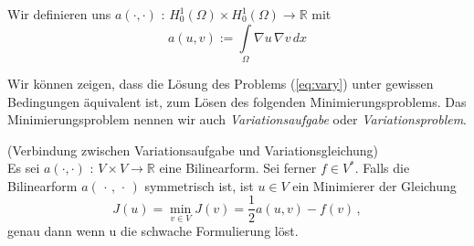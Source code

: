 Wir definieren uns $a( \cdot , \cdot )$ : $H^1_0 (\Omega) \times H^1_0(\Omega) \rightarrow \mathbb{R}$ mit
\begin{equation*}
a(u,v) := \int\limits_{\Omega} \nabla u \, \nabla v \, dx
\end{equation*}

Wir können zeigen, dass die Lösung des Problems (\ref{eq:vary}) unter gewissen Bedingungen äquivalent ist, zum Lösen des folgenden Minimierungsproblems. Das Minimierungsproblem nennen wir auch \textit{Variationsaufgabe} oder \textit{Variationsproblem}.

\begin{Satz} (Verbindung zwischen Variationsaufgabe und Variationsgleichung) \\
Es sei $a( \cdot , \cdot )$ : $ V \times V \rightarrow \mathbb{R} $ eine Bilinearform. Sei ferner $f \in V^{*}$.
Falls die Bilinearform $a(\, \cdot \, , \, \cdot \, )$ symmetrisch ist, ist $u \in V$ ein Minimierer der Gleichung
\begin{equation} \label{eq:mini}
J(u) = \min_{v \in V} J(v) = \dfrac{1}{2} a(u,v) - f(v) \, ,
\end{equation}
genau dann wenn u die schwache Formulierung löst.
\end{Satz}



